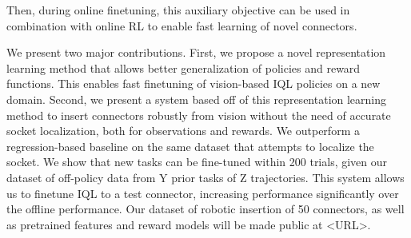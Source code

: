 \documentclass[letterpaper, 10 pt, conference, final]{ieeeconf}   %
\newcommand{\numconnectors}{50}
\begin{document}
Then, during online finetuning, this auxiliary objective can be used in combination with online RL to enable fast learning of novel connectors.


We present two major contributions.
First, we propose a novel representation learning method that allows better generalization of policies and reward functions.
This enables fast finetuning of vision-based IQL policies on a new domain. 
Second, we present a system based off of this representation learning method to insert connectors robustly from vision without the need of accurate socket localization,
both for observations and rewards. We outperform a regression-based baseline on the same dataset that attempts to localize the socket.
We show that new tasks can be fine-tuned within 200 trials, given our dataset of off-policy data from Y prior tasks of Z trajectories.
This system allows us to finetune IQL to a test connector, increasing performance significantly over the offline performance.
Our dataset of robotic insertion of \numconnectors{} connectors, as well as pretrained features and reward models will be made public at <URL>.


\end{document}
